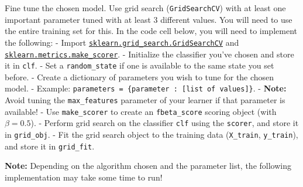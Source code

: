 \documentclass[11pt]{article}
\begin{document}
Fine tune the chosen model. Use grid search (\texttt{GridSearchCV}) with
at least one important parameter tuned with at least 3 different values.
You will need to use the entire training set for this. In the code cell
below, you will need to implement the following: - Import
\href{http://scikit-learn.org/0.17/modules/generated/sklearn.grid_search.GridSearchCV.html}{\texttt{sklearn.grid\_search.GridSearchCV}}
and
\href{http://scikit-learn.org/stable/modules/generated/sklearn.metrics.make_scorer.html}{\texttt{sklearn.metrics.make\_scorer}}.
- Initialize the classifier you've chosen and store it in \texttt{clf}.
- Set a \texttt{random\_state} if one is available to the same state you
set before. - Create a dictionary of parameters you wish to tune for the
chosen model. - Example:
\texttt{parameters\ =\ \{\textquotesingle{}parameter\textquotesingle{}\ :\ {[}list\ of\ values{]}\}}.
- \textbf{Note:} Avoid tuning the \texttt{max\_features} parameter of
your learner if that parameter is available! - Use \texttt{make\_scorer}
to create an \texttt{fbeta\_score} scoring object (with
\(\beta = 0.5\)). - Perform grid search on the classifier \texttt{clf}
using the \texttt{\textquotesingle{}scorer\textquotesingle{}}, and store
it in \texttt{grid\_obj}. - Fit the grid search object to the training
data (\texttt{X\_train}, \texttt{y\_train}), and store it in
\texttt{grid\_fit}.

\textbf{Note:} Depending on the algorithm chosen and the parameter list,
the following implementation may take some time to run!
\end{document}
